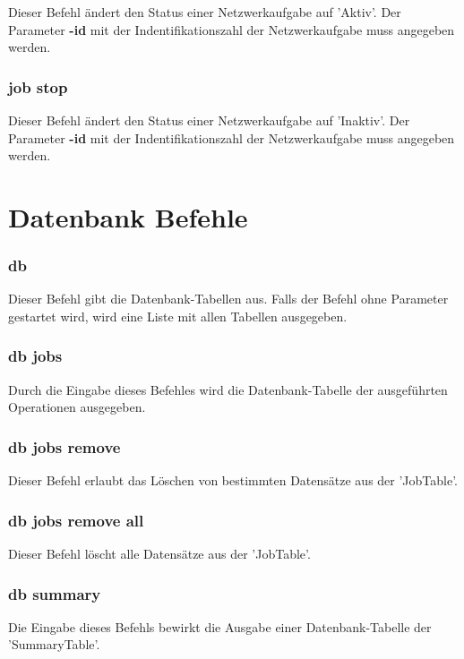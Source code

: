\documentclass[11pt,a4paper]{report}
\begin{document}
Dieser Befehl ändert den Status einer Netzwerkaufgabe auf 'Aktiv'. Der Parameter \textbf{-id} mit der Indentifikationszahl der Netzwerkaufgabe muss angegeben werden.

\subsubsection{job stop}

Dieser Befehl ändert den Status einer Netzwerkaufgabe auf 'Inaktiv'. Der Parameter \textbf{-id} mit der Indentifikationszahl der Netzwerkaufgabe muss angegeben werden.

\section{Datenbank Befehle}

\subsubsection{db}

Dieser Befehl gibt die Datenbank-Tabellen aus. Falls der Befehl ohne Parameter gestartet wird, wird eine Liste mit allen Tabellen ausgegeben.

\subsubsection{db jobs}

Durch die Eingabe dieses Befehles wird die Datenbank-Tabelle der ausgeführten Operationen ausgegeben.

\subsubsection{db jobs remove}

Dieser Befehl erlaubt das Löschen von bestimmten Datensätze aus der 'JobTable'.

\subsubsection{db jobs remove all}

Dieser Befehl löscht alle Datensätze aus der 'JobTable'.

\subsubsection{db summary}

Die Eingabe dieses Befehls bewirkt die Ausgabe einer Datenbank-Tabelle der 'SummaryTable'.
\end{document}
